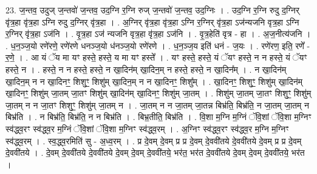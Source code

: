 \documentclass[17pt]{extarticle}
\begin{document}
23. ज॒न्तव॒ उदुज् ज॒न्तवो॑ ज॒न्तव॒ उद॒ग्नि र॒ग्नि रुज् ज॒न्तवो॑ ज॒न्तव॒ उद॒ग्निः । . उद॒ग्नि र॒ग्नि रुदु द॒ग्निर् वृ॑त्र॒हा वृ॑त्र॒हा ऽग्नि रुदु द॒ग्निर् वृ॑त्र॒हा । . अ॒ग्निर् वृ॑त्र॒हा वृ॑त्र॒हा ऽग्नि र॒ग्निर् वृ॑त्र॒हा ऽज॑न्यजनि वृत्र॒हा ऽग्नि र॒ग्निर् वृ॑त्र॒हा ऽज॑नि । . वृ॒त्र॒हा ऽज॑ न्यजनि वृत्र॒हा वृ॑त्र॒हा ऽज॑नि । . वृ॒त्र॒हेति॑ वृत्र - हा । . अ॒ज॒नीत्य॑जनि । . ध॒न॒ञ्ज॒यो रणे॑रणे॒ रणे॑रणे धनञ्ज॒यो ध॑नञ्ज॒यो रणे॑रणे । . ध॒न॒ञ्ज॒य इति॑ धनं - ज॒यः । . रणे॑रण॒ इति॒ रणे᳚ - र॒णे॒ । . आ यं ॅय मा यꣳ हस्ते॒ हस्ते॒ य मा यꣳ हस्ते᳚ । . यꣳ हस्ते॒ हस्ते॒ यं ॅयꣳ हस्ते॒ न न हस्ते॒ यं ॅयꣳ हस्ते॒ न । . हस्ते॒ न न हस्ते॒ हस्ते॒ न खा॒दिन॑म् खा॒दिन॒म् न हस्ते॒ हस्ते॒ न खा॒दिन᳚म् । . न खा॒दिन॑म् खा॒दिन॒म् न न खा॒दिनꣳ॒॒ शिशुꣳ॒॒ शिशु॑म् खा॒दिन॒म् न न खा॒दिनꣳ॒॒ शिशु᳚म् । . खा॒दिनꣳ॒॒ शिशुꣳ॒॒ शिशु॑म् खा॒दिन॑म् खा॒दिनꣳ॒॒ शिशु॑म् जा॒तम् जा॒तꣳ शिशु॑म् खा॒दिन॑म् खा॒दिनꣳ॒॒ शिशु॑म् जा॒तम् । . शिशु॑म् जा॒तम् जा॒तꣳ शिशुꣳ॒॒ शिशु॑म् जा॒तम् न न जा॒तꣳ शिशुꣳ॒॒ शिशु॑म् जा॒तम् न । . जा॒तम् न न जा॒तम् जा॒तन्न बिभ्र॑ति॒ बिभ्र॑ति॒ न जा॒तम् जा॒तम् न बिभ्र॑ति । . न बिभ्र॑ति॒ बिभ्र॑ति॒ न न बिभ्र॑ति । . बिभ्र॒तीति॒ बिभ्र॑ति । . वि॒शा म॒ग्नि म॒ग्निं ॅवि॒शां ॅवि॒शा म॒ग्निꣳ स्व॑द्ध्व॒रꣳ स्व॑द्ध्व॒र म॒ग्निं ॅवि॒शां ॅवि॒शा म॒ग्निꣳ स्व॑द्ध्व॒रम् । . अ॒ग्निꣳ स्व॑द्ध्व॒रꣳ स्व॑द्ध्व॒र म॒ग्नि म॒ग्निꣳ स्व॑द्ध्व॒रम् । . स्व॒द्ध्व॒रमिति॑ सु - अ॒ध्व॒रम् । . प्र दे॒वम् दे॒वम् प्र प्र दे॒वम् दे॒ववी॑तये दे॒ववी॑तये दे॒वम् प्र प्र दे॒वम् दे॒ववी॑तये । . दे॒वम् दे॒ववी॑तये दे॒ववी॑तये दे॒वम् दे॒वम् दे॒ववी॑तये॒ भर॑त॒ भर॑त दे॒ववी॑तये दे॒वम् दे॒वम् दे॒ववी॑तये॒ भर॑त । \newline
\end{document}
